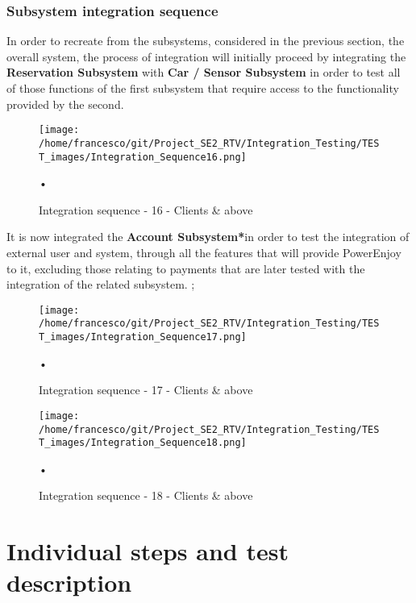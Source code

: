 \documentclass[10pt, a4paper,titlepage]{article}
\begin{document}
\subsubsection{Subsystem integration sequence}
In order to recreate from the subsystems, considered in the previous section, the overall system, the process of integration will initially proceed by integrating the \textbf{Reservation Subsystem} with \textbf{Car / Sensor Subsystem} in order to test all of those functions of the first subsystem that require access to the functionality provided by the second.
\begin{figure}[h]
\begin{center}
\texttt{[image: /home/francesco/git/Project\_SE2\_RTV/Integration\_Testing/TEST\_images/Integration\_Sequence16.png]}
\caption{Integration sequence - 16 - Clients \& above}
\label{fig:int_seq16}
\end{center}•
\end{figure}
It is now integrated  the \textbf{Account Subsystem*}in order to test the integration of external user and system, through all the features that will provide PowerEnjoy to it, excluding those relating to payments that are later tested with the integration of the related subsystem.
\pagebreak;
\begin{figure}[h]
\begin{center}
\texttt{[image: /home/francesco/git/Project\_SE2\_RTV/Integration\_Testing/TEST\_images/Integration\_Sequence17.png]}
\caption{Integration sequence - 17 - Clients \& above}
\label{fig:int_seq17}
\end{center}•
\end{figure}
\begin{figure}[h]
\begin{center}
\texttt{[image: /home/francesco/git/Project\_SE2\_RTV/Integration\_Testing/TEST\_images/Integration\_Sequence18.png]}
\caption{Integration sequence - 18 - Clients \& above}
\label{fig:int_seq18}
\end{center}•
\end{figure}
\clearpage
\section{Individual steps and test description}
\end{document}
